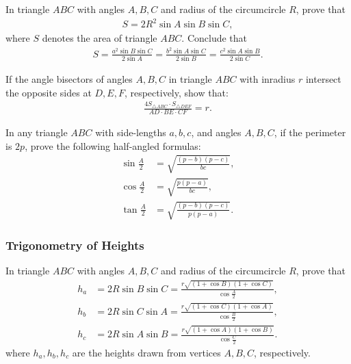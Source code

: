     

\begin{tcolorbox}
    \begin{question}[name=Area in Terms of Sine of Angles]\label{q:area-sin}
        In triangle $ABC$ with angles $A,B,C$ and radius of the circumcircle $R$, prove that
        \begin{align*}
            S = 2R^2 \sin A \sin B \sin C,
        \end{align*}
        where $S$ denotes the area of triangle $ABC$. Conclude that
        \begin{align*}
            S = \frac{a^2 \sin B \sin C}{2 \sin A} = \frac{b^2 \sin A \sin C}{2 \sin B} = \frac{c^2 \sin A \sin B}{2 \sin C}.
        \end{align*}
    \end{question}
\end{tcolorbox}

\begin{question}
    If the angle bisectors of angles $A,B,C$ in triangle $ABC$ with inradius $r$ intersect the opposite sides at $D,E,F$, respectively, show that:
    \begin{align*}
        \frac{4S_{\triangle ABC}\cdot S_{\triangle DEF}}{AD \cdot BE \cdot CF}=r.
    \end{align*}
\end{question}

\begin{question}
    In any triangle $ABC$ with side-lengths $a,b,c$, and angles $A,B,C$, if the perimeter is $2p$, prove the following half-angled formulas:
    \begin{align*}
        \sin\frac{A}{2} &= \sqrt{\frac{(p-b)(p-c)}{bc}},\\
        \cos\frac{A}{2} &= \sqrt{\frac{p(p-a)}{bc}},\\
        \tan\frac{A}{2} &= \sqrt{\frac{(p-b)(p-c)}{p(p-a)}}.
    \end{align*}
\end{question}

\subsubsection{Trigonometry of Heights}

\begin{tcolorbox}
    \begin{question}[name=Calculating the Height of Triangle]
        In triangle $ABC$ with angles $A,B,C$ and radius of the circumcircle $R$, prove that
        \begin{align*}
            h_a &= 2R \sin B \sin C = \frac{r\sqrt{(1+\cos B)(1+\cos C)}}{\cos \displaystyle \frac{A}{2}},\\
            h_b &= 2R \sin C \sin A = \frac{r\sqrt{(1+\cos C)(1+\cos A)}}{\cos \displaystyle \frac{B}{2}},\\
            h_c &= 2R \sin A \sin B=  \frac{r\sqrt{(1+\cos A)(1+\cos B)}}{\cos \displaystyle \frac{C}{2}}.
        \end{align*}
        where $h_a,h_b,h_c$ are the heights drawn from vertices $A,B,C$, respectively.
    \end{question}
\end{tcolorbox}

